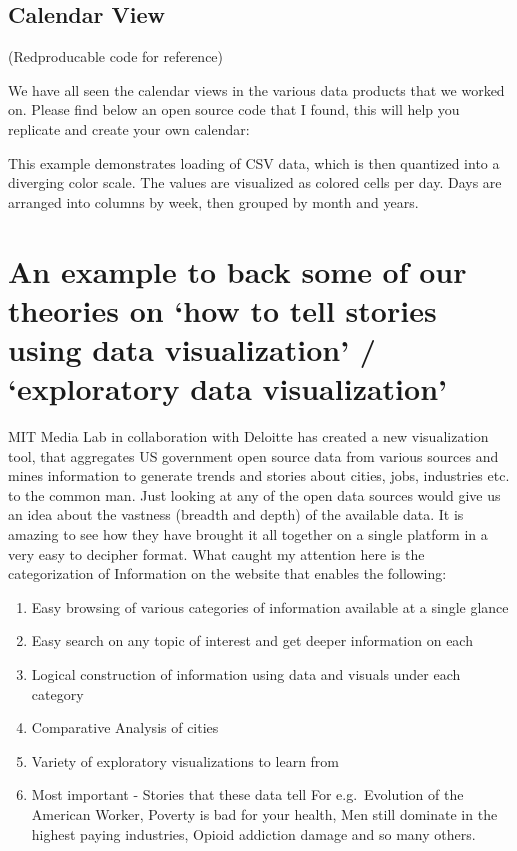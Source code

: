 \documentclass[]{book}
\providecommand{\tightlist}{%
  \setlength{\itemsep}{0pt}\setlength{\parskip}{0pt}}
\theoremstyle{definition}
\theoremstyle{definition}
\theoremstyle{definition}
\theoremstyle{remark}
\begin{document}
\subsection{Calendar View}\label{calendar-view}

(Redproducable code for reference)

\citep{Calendar_Layout} We have all seen the calendar views in the
various data products that we worked on. Please find below an open
source code that I found, this will help you replicate and create your
own calendar: \citep{CalendarView}

This example demonstrates loading of CSV data, which is then quantized
into a diverging color scale. The values are visualized as colored cells
per day. Days are arranged into columns by week, then grouped by month
and years.

\section{\texorpdfstring{An example to back some of our theories on `how
to tell stories using data visualization' / `exploratory data
visualization'}{An example to back some of our theories on how to tell stories using data visualization / exploratory data visualization}}\label{an-example-to-back-some-of-our-theories-on-how-to-tell-stories-using-data-visualization-exploratory-data-visualization}

\citep{DataUSA} MIT Media Lab in collaboration with Deloitte has created
a new visualization tool, that aggregates US government open source data
from various sources and mines information to generate trends and
stories about cities, jobs, industries etc. to the common man. Just
looking at any of the open data sources would give us an idea about the
vastness (breadth and depth) of the available data. It is amazing to see
how they have brought it all together on a single platform in a very
easy to decipher format. What caught my attention here is the
categorization of Information on the website that enables the following:

\begin{enumerate}
\def\labelenumi{\arabic{enumi}.}
\tightlist
\item
  Easy browsing of various categories of information available at a
  single glance
\item
  Easy search on any topic of interest and get deeper information on
  each
\item
  Logical construction of information using data and visuals under each
  category
\item
  Comparative Analysis of cities
\item
  Variety of exploratory visualizations to learn from
\item
  Most important - Stories that these data tell For e.g.~Evolution of
  the American Worker, Poverty is bad for your health, Men still
  dominate in the highest paying industries, Opioid addiction damage and
  so many others.
\end{enumerate}
\end{document}
